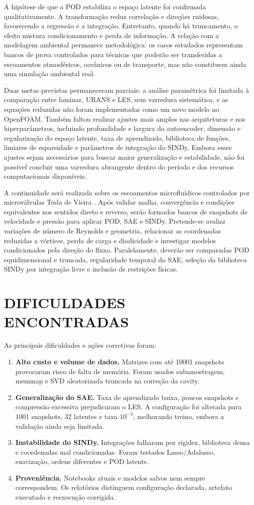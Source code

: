 \documentclass[12pt,a4paper]{article}
\newcommand{\novasecao}[1]{\clearpage\section{#1}}
\begin{document}
A hipótese de que a POD estabiliza o espaço latente foi confirmada qualitativamente. A transformação reduz correlação e direções ruidosas, favorecendo a regressão e a integração. Entretanto, quando há truncamento, o efeito mistura condicionamento e perda de informação. A relação com a modelagem ambiental permanece metodológica: os casos estudados representam bancos de prova controlados para técnicas que poderão ser transferidas a escoamentos atmosféricos, oceânicos ou de transporte, mas não constituem ainda uma simulação ambiental real.

Duas metas previstas permaneceram parciais: a análise paramétrica foi limitada à comparação entre laminar, URANS e LES, sem varredura sistemática, e as equações reduzidas não foram implementadas como um novo modelo no OpenFOAM. Também faltou realizar ajustes mais amplos nas arquiteturas e nos hiperparâmetros, incluindo profundidade e largura do autoencoder, dimensão e regularização do espaço latente, taxa de aprendizado, biblioteca de funções, limiares de esparsidade e parâmetros de integração do SINDy. Embora esses ajustes sejam necessários para buscar maior generalização e estabilidade, não foi possível concluir uma varredura abrangente dentro do período e dos recursos computacionais disponíveis.

A continuidade será realizada sobre os escoamentos microfluídicos controlados por microválvulas Tesla de Vieira \cite{vieira2025}. Após validar malha, convergência e condições equivalentes nos sentidos direto e reverso, serão formados bancos de snapshots de velocidade e pressão para aplicar POD, SAE e SINDy. Pretende-se avaliar variações de número de Reynolds e geometria, relacionar as coordenadas reduzidas a vórtices, perda de carga e diodicidade e investigar modelos condicionados pela direção do fluxo. Paralelamente, deverão ser comparadas POD equidimensional e truncada, regularidade temporal do SAE, seleção da biblioteca SINDy por integração livre e inclusão de restrições físicas.

\novasecao{DIFICULDADES ENCONTRADAS}
As principais dificuldades e ações corretivas foram:
\begin{enumerate}
\item \textbf{Alto custo e volume de dados.} Matrizes com até 10001 snapshots provocaram risco de falta de memória. Foram usados subamostragem, memmap e SVD aleatorizada truncada na correção da cavity.
\item \textbf{Generalização do SAE.} Taxa de aprendizado baixa, poucos snapshots e compressão excessiva prejudicaram o LES. A configuração foi alterada para 1001 snapshots, 32 latentes e taxa $10^{-3}$, melhorando treino, embora a validação ainda seja limitada.
\item \textbf{Instabilidade do SINDy.} Integrações falharam por rigidez, biblioteca densa e coordenadas mal condicionadas. Foram testados Lasso/Adalasso, suavização, ordens diferentes e POD latente.
\item \textbf{Proveniência.} Notebooks atuais e modelos salvos nem sempre correspondem. Os relatórios distinguem configuração declarada, artefato executado e reexecução corrigida.
\end{enumerate}
\end{document}
